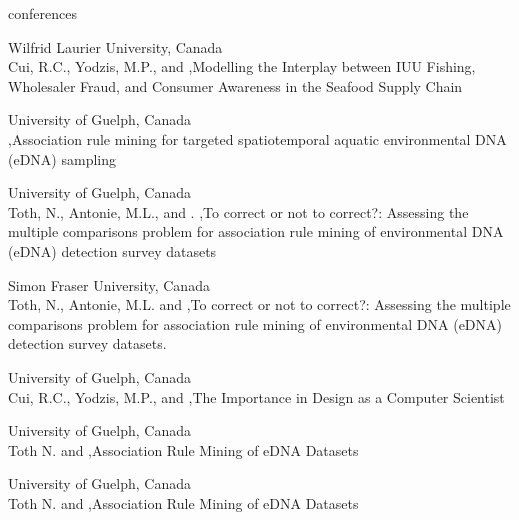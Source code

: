 \medskip
\begin{revlist}{conferences}
\item {}
  Wilfrid Laurier University, Canada\\ 
  \dsup Cui, R.C., Yodzis, M.P., and \me \sep Modelling the Interplay between IUU Fishing, Wholesaler Fraud, and Consumer Awareness in the Seafood Supply Chain
\item {}
  University of Guelph, Canada\\
  \me \sep Association rule mining for targeted spatiotemporal aquatic
  environmental DNA (eDNA) sampling
\item {}
  University of Guelph, Canada\\
  \dsup Toth, N., Antonie, M.L., and \me. \sep To correct or not to correct?:
  Assessing the multiple comparisons problem for association rule mining of
  environmental DNA (eDNA) detection survey datasets 
\item {}
  Simon Fraser University, Canada\\
  \dsup Toth, N., Antonie, M.L. and \me \sep To correct or not to correct?:
  Assessing the multiple comparisons problem for association rule mining of
  environmental DNA (eDNA) detection survey datasets.
\item {}
  University of Guelph, Canada\\
  \dsup Cui, R.C., Yodzis, M.P., and \me \sep The Importance in Design as a Computer Scientist
\item {}
  University of Guelph, Canada\\
  \dsup Toth N. and \me \sep Association Rule Mining of eDNA Datasets
\item {}
  University of Guelph, Canada\\
  \dsup Toth N. and \me \sep Association Rule Mining of eDNA Datasets

\end{revlist}
